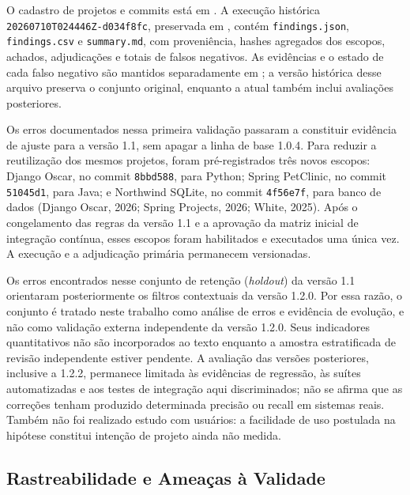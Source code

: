 \documentclass[12pt,a4paper,oneside]{report}
\begin{document}
O cadastro de projetos e commits está em . A execução histórica \texttt{20260710T024446Z-d034f8fc}, preservada em , contém \texttt{findings.json}, \texttt{findings.csv} e \texttt{summary.md}, com proveniência, hashes agregados dos escopos, achados, adjudicações e totais de falsos negativos. As evidências e o estado de cada falso negativo são mantidos separadamente em ; a versão histórica desse arquivo preserva o conjunto original, enquanto a atual também inclui avaliações posteriores.

Os erros documentados nessa primeira validação passaram a constituir evidência de ajuste para a versão 1.1, sem apagar a linha de base 1.0.4. Para reduzir a reutilização dos mesmos projetos, foram pré-registrados três novos escopos: Django Oscar, no commit \texttt{8bbd588}, para Python; Spring PetClinic, no commit \texttt{51045d1}, para Java; e Northwind SQLite, no commit \texttt{4f56e7f}, para banco de dados (Django Oscar, 2026; Spring Projects, 2026; White, 2025). Após o congelamento das regras da versão 1.1 e a aprovação da matriz inicial de integração contínua, esses escopos foram habilitados e executados uma única vez. A execução e a adjudicação primária permanecem versionadas.

Os erros encontrados nesse conjunto de retenção (\textit{holdout}) da versão 1.1 orientaram posteriormente os filtros contextuais da versão 1.2.0. Por essa razão, o conjunto é tratado neste trabalho como análise de erros e evidência de evolução, e não como validação externa independente da versão 1.2.0. Seus indicadores quantitativos não são incorporados ao texto enquanto a amostra estratificada de revisão independente estiver pendente. A avaliação das versões posteriores, inclusive a 1.2.2, permanece limitada às evidências de regressão, às suítes automatizadas e aos testes de integração aqui discriminados; não se afirma que as correções tenham produzido determinada precisão ou recall em sistemas reais. Também não foi realizado estudo com usuários: a facilidade de uso postulada na hipótese constitui intenção de projeto ainda não medida.

\subsection{Rastreabilidade e Ameaças à Validade}
\end{document}
